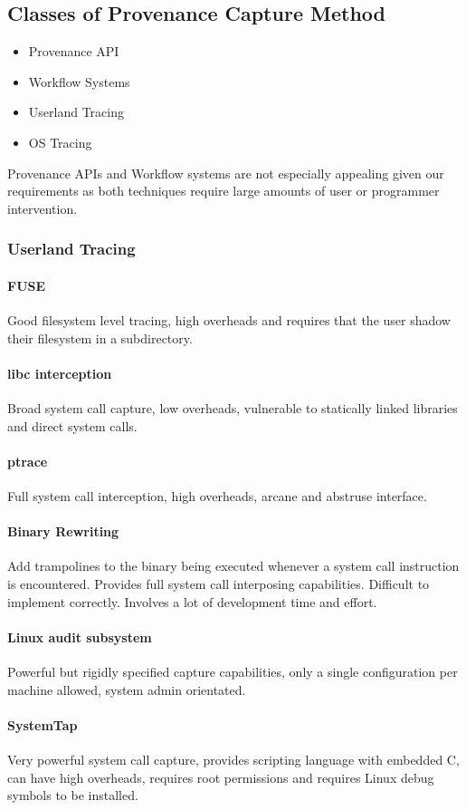 \subsection{Classes of Provenance Capture Method}
\begin{itemize}
\item Provenance API
\item Workflow Systems
\item Userland Tracing
\item OS Tracing
\end{itemize}

Provenance APIs and Workflow systems are not especially appealing given our requirements as both techniques require large amounts of user or programmer intervention.

\subsubsection{Userland Tracing}
\paragraph{FUSE}
Good filesystem level tracing, high overheads and requires that the user shadow their filesystem in a subdirectory.
\paragraph{libc interception}
Broad system call capture, low overheads, vulnerable to statically linked libraries and direct system calls.
\paragraph{ptrace}
Full system call interception, high overheads, arcane and abstruse interface.
\paragraph{Binary Rewriting}
Add trampolines to the binary being executed whenever a system call instruction is encountered. Provides full system call interposing capabilities. Difficult to implement correctly. Involves a lot of development time and effort.
\paragraph{Linux audit subsystem}
Powerful but rigidly specified capture capabilities, only a single configuration per machine allowed, system admin orientated. 
\paragraph{SystemTap}
Very powerful system call capture, provides scripting language with embedded C, can have high overheads, requires root permissions and requires Linux debug symbols to be installed.

